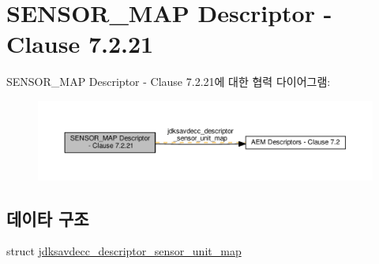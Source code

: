 \hypertarget{group__descriptor__sensor__map}{}\section{S\+E\+N\+S\+O\+R\+\_\+\+M\+AP Descriptor -\/ Clause 7.2.21}
\label{group__descriptor__sensor__map}
S\+E\+N\+S\+O\+R\+\_\+\+M\+AP Descriptor -\/ Clause 7.2.21에 대한 협력 다이어그램\+:
\nopagebreak
\begin{figure}[H]
\begin{center}
\leavevmode
\includegraphics[width=350pt]{group__descriptor__sensor__map}
\end{center}
\end{figure}
\subsection*{데이타 구조}
\begin{DoxyCompactItemize}
\item 
struct \hyperlink{structjdksavdecc__descriptor__sensor__unit__map}{jdksavdecc\+\_\+descriptor\+\_\+sensor\+\_\+unit\+\_\+map}
\end{DoxyCompactItemize}
